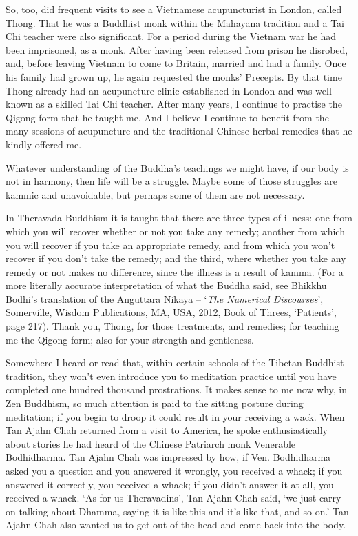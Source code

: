 So, too, did frequent visits to see a Vietnamese acupuncturist in
London, called Thong. That he was a Buddhist monk within the Mahayana
tradition and a Tai Chi teacher were also significant. For a period
during the Vietnam war he had been imprisoned, as a monk. After having
been released from prison he disrobed, and, before leaving Vietnam to
come to Britain, married and had a family. Once his family had grown up,
he again requested the monks' Precepts. By that time Thong already had
an acupuncture clinic established in London and was well-known as a
skilled Tai Chi teacher. After many years, I continue to practise the
Qigong form that he taught me. And I believe I continue to benefit from
the many sessions of acupuncture and the traditional Chinese herbal
remedies that he kindly offered me.

Whatever understanding of the Buddha's teachings we might have, if our
body is not in harmony, then life will be a struggle. Maybe some of
those struggles are kammic and unavoidable, but perhaps some of them are
not necessary.

In Theravada Buddhism it is taught that there are three types of
illness: one from which you will recover whether or not you take any
remedy; another from which you will recover if you take an appropriate
remedy, and from which you won't recover if you don't take the remedy;
and the third, where whether you take any remedy or not makes no
difference, since the illness is a result of kamma.
(For a more literally accurate interpretation of what the Buddha said, see
Bhikkhu Bodhi's translation of the Anguttara Nikaya -- `\emph{The Numerical
  Discourses}', Somerville, Wisdom \mbox{Publications}, MA, USA, 2012, Book of Threes,
`Patients', page 217).
Thank you, Thong,
for those treatments, and remedies; for teaching me the Qigong form;
also for your strength and gentleness.

Somewhere I heard or read that, within certain schools of the Tibetan
Buddhist tradition, they won't even introduce you to meditation practice
until you have completed one hundred thousand prostrations. It makes
sense to me now why, in Zen Buddhism, so much attention is paid to the
sitting posture during meditation; if you begin to droop it could result
in your receiving a wack. When Tan Ajahn Chah returned from a visit to
America, he spoke enthusiastically about stories he had heard of the
Chinese Patriarch monk Venerable Bodhidharma. Tan Ajahn Chah was
impressed by how, if Ven. Bodhidharma asked you a question and you
answered it wrongly, you received a whack; if you answered it correctly,
you received a whack; if you didn't answer it at all, you received a
whack. `As for us Theravadins', Tan Ajahn Chah said, `we just carry on
talking about Dhamma, saying it is like this and it's like that, and so
on.' Tan Ajahn Chah also wanted us to get out of the head and come back
into the body.

